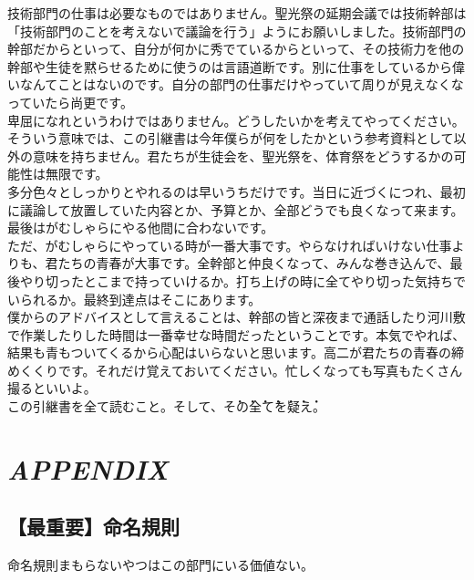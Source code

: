 \documentclass[dvipdfmx,jb5]{jarticle}
\begin{document}
技術部門の仕事は必要なものではありません。聖光祭の延期会議では技術幹部は「技術部門のことを考えないで議論を行う」ようにお願いしました。技術部門の幹部だからといって、自分が何かに秀でているからといって、その技術力を他の幹部や生徒を黙らせるために使うのは言語道断です。別に仕事をしているから偉いなんてことはないのです。自分の部門の仕事だけやっていて周りが見えなくなっていたら尚更です。
\\

卑屈になれというわけではありません。どうしたいかを考えてやってください。そういう意味では、この引継書は今年僕らが何をしたかという参考資料として以外の意味を持ちません。君たちが生徒会を、聖光祭を、体育祭をどうするかの可能性は無限です。
\\

多分色々としっかりとやれるのは早いうちだけです。当日に近づくにつれ、最初に議論して放置していた内容とか、予算とか、全部どうでも良くなって来ます。最後はがむしゃらにやる他間に合わないです。
\\

ただ、がむしゃらにやっている時が一番大事です。やらなければいけない仕事よりも、君たちの青春が大事です。全幹部と仲良くなって、みんな巻き込んで、最後やり切ったとこまで持っていけるか。打ち上げの時に全てやり切った気持ちでいられるか。最終到達点はそこにあります。
\\

僕からのアドバイスとして言えることは、幹部の皆と深夜まで通話したり河川敷で作業したりした時間は一番幸せな時間だったということです。本気でやれば、結果も青もついてくるから心配はいらないと思います。高二が君たちの青春の締めくくりです。それだけ覚えておいてください。忙しくなっても写真もたくさん撮るといいよ。
\\

この引継書を全て読むこと。そして、\.そ\.の\.全\.て\.を\.疑\.え。
\section{\textit{APPENDIX}}
\subsection{【最重要】命名規則}\label{sec:命名規則}
命名規則まもらないやつはこの部門にいる価値ない。
\end{document}

